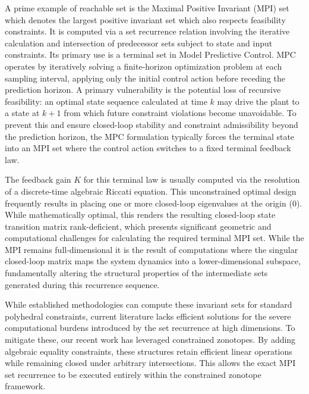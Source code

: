 \documentclass[journal,twoside,web]{ieeecolor}
\begin{document}
A prime example of reachable set is the Maximal Positive Invariant (MPI) set which denotes the largest positive invariant set which also respects feasibility constraints. It is computed via a set recurrence relation involving the iterative calculation and intersection of predecessor sets subject to state and input constraints. Its primary use is a terminal set in Model Predictive Control\cite{rakovic2018handbook}. MPC operates by iteratively solving a finite-horizon optimization problem at each sampling interval, applying only the initial control action before receding the prediction horizon. A primary vulnerability is the potential loss of recursive feasibility: an optimal state sequence calculated at time $k$ may drive the plant to a state at $k+1$ from which future constraint violations become unavoidable. To prevent this and ensure closed-loop stability and constraint admissibility beyond the prediction horizon, the MPC formulation typically forces the terminal state into an MPI set where the control action switches to a fixed terminal feedback law.



 

The feedback gain $K$ for this terminal law is usually computed via the resolution of a discrete-time algebraic Riccati equation. This unconstrained optimal design frequently results in placing one or more closed-loop eigenvalues at the origin ($0$). While mathematically optimal, this renders the resulting closed-loop state transition matrix rank-deficient, which presents significant geometric and computational challenges for calculating the required terminal MPI set. 
While the MPI remains full-dimensional it is the result of computations where the singular closed-loop matrix maps the system dynamics into a lower-dimensional subspace, fundamentally altering the structural properties of the intermediate sets generated during this recurrence sequence.

While established methodologies can compute these invariant sets for standard polyhedral constraints, current literature lacks efficient solutions for the severe computational burdens introduced by the set recurrence at high dimensions. To mitigate these, our recent work \cite{10552328} has leveraged constrained zonotopes. By adding algebraic equality constraints, these structures retain efficient linear operations while remaining closed under arbitrary intersections. This allows the exact MPI set recurrence to be executed entirely within the constrained zonotope framework. 
\end{document}
